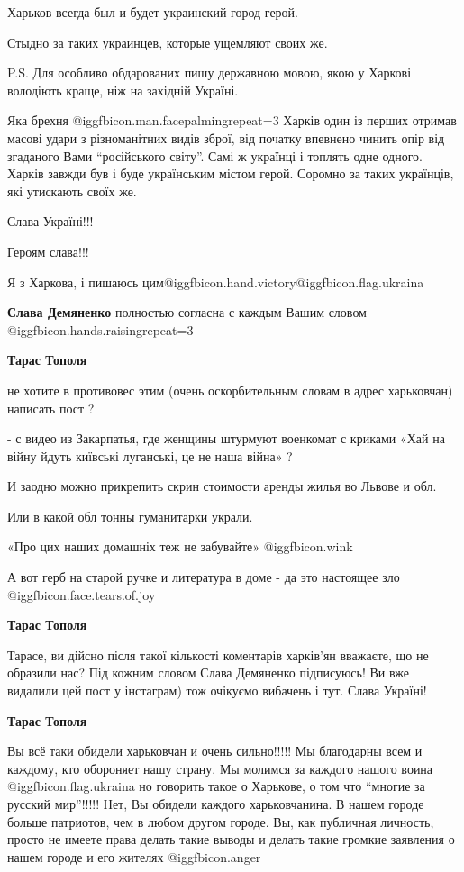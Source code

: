 \begin{itemize}
\begin{itemize}
Харьков всегда был и будет украинский город герой.

Стыдно за таких украинцев, которые ущемляют своих же.

P.S. Для особливо обдарованих пишу державною мовою, якою у Харкові володіють краще, ніж на західній Україні.

Яка брехня  @igg{fbicon.man.facepalming}{repeat=3}  Харків один із перших отримав масові удари з різноманітних
видів зброї, від початку впевнено чинить опір від згаданого Вами \enquote{російського
світу}. Самі ж українці і топлять одне одного. Харків завжди був і буде
українським містом герой. Соромно за таких українців, які утискають своїх же.

Слава Україні!!!

Героям слава!!!

Я з Харкова, і пишаюсь цим@igg{fbicon.hand.victory}@igg{fbicon.flag.ukraina}

\textbf{Слава Демяненко} полностью согласна с каждым Вашим словом @igg{fbicon.hands.raising}{repeat=3} 

\textbf{Тарас Тополя} 

не хотите в противовес этим (очень оскорбительным словам в адрес харьковчан)
написать пост ?

- с видео из Закарпатья, где женщины штурмуют военкомат с криками «Хай на війну
йдуть київські луганські, це не наша війна» ?

И заодно можно прикрепить скрин стоимости аренды жилья во Львове и обл.

Или в какой обл тонны гуманитарки украли.

«Про цих наших домашніх теж не забувайте» @igg{fbicon.wink} 

А вот герб на старой ручке и литература в доме - да это настоящее зло @igg{fbicon.face.tears.of.joy} 

\textbf{Тарас Тополя} 

Тарасе, ви дійсно після такої кількості коментарів харків'ян вважаєте, що не
образили нас? Під кожним словом Слава Демяненко підписуюсь! Ви вже видалили цей
пост у інстаграм) тож очікуємо вибачень і тут. Слава Україні!

\textbf{Тарас Тополя} 

Вы всё таки обидели харьковчан и очень сильно!!!!! Мы благодарны всем и
каждому, кто обороняет нашу страну. Мы молимся за каждого нашого воина @igg{fbicon.flag.ukraina} но
говорить такое о Харькове, о том что \enquote{многие за русский мир}!!!!! Нет, Вы
обидели каждого харьковчанина. В нашем городе больше патриотов, чем в любом
другом городе. Вы, как публичная личность, просто не имеете права делать такие
выводы и делать такие громкие заявления о нашем городе и его жителях @igg{fbicon.anger} 


\end{itemize}
\end{itemize}
